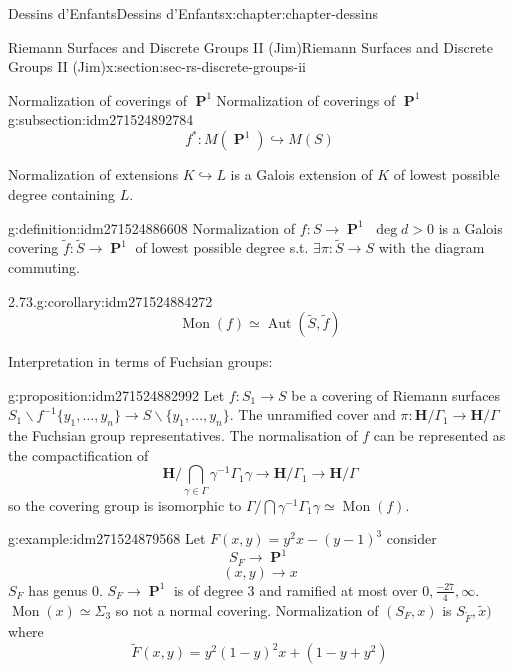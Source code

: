 \documentclass[oneside,10pt,]{book}
\numberwithin{equation}{section}
\newcommand{\inv}{^{-1}}
\newcommand{\HH}{\mathbf{H}}
\DeclareMathOperator{\PP}{\mathbf{P}}
\DeclareMathOperator{\Aut}{Aut}
\newcommand{\gt}{>}
\begin{document}
\begin{chapterptx}{Dessins d'Enfants}{}{Dessins d'Enfants}{}{}{x:chapter:chapter-dessins}
\begin{sectionptx}{Riemann Surfaces and Discrete Groups II (Jim)}{}{Riemann Surfaces and Discrete Groups II (Jim)}{}{}{x:section:sec-rs-discrete-groups-ii}
\begin{subsectionptx}{Normalization of coverings of \(\PP^1\)}{}{Normalization of coverings of \(\PP^1\)}{}{}{g:subsection:idm271524892784}
\begin{equation*}
f^* \colon M(\PP^1 ) \hookrightarrow M(S)
\end{equation*}
%
\par
Normalization of extensions \(K \hookrightarrow L\) is a Galois extension of \(K \) of lowest possible degree containing \(L\).%
\begin{definition}{}{g:definition:idm271524886608}%
Normalization of \(f\colon S\to \PP^1\) \(\deg d \gt 0 \) is a Galois covering \(\tilde f \colon \tilde S \to \PP^1 \) of  lowest possible degree s.t. \(\exists \pi \colon \tilde S \to S\) with  the diagram commuting.%
\end{definition}
\begin{corollary}{2.73.}{}{g:corollary:idm271524884272}%
%
\begin{equation*}
\operatorname{Mon}(f)  \simeq \Aut(\tilde S, \tilde f)
\end{equation*}
%
\end{corollary}
Interpretation in terms of Fuchsian groups:%
\begin{proposition}{}{}{g:proposition:idm271524882992}%
Let \(f\colon S_1 \to S\) be a covering of Riemann surfaces \(S_1\smallsetminus f\inv \{ y_1, \ldots, y_n \} \to S \smallsetminus\{ y_1, \ldots, y_n \}\). The unramified cover and \(\pi \colon \HH/ \Gamma_1 \to \HH/ \Gamma\) the Fuchsian group representatives. The normalisation of \(f\) can be represented as the compactification of%
\begin{equation*}
\HH/ \bigcap_{\gamma \in \Gamma} \gamma \inv \Gamma_1 \gamma \to \HH/\Gamma_1 \to \HH/\Gamma
\end{equation*}
so the covering group is isomorphic to \(\Gamma/ \bigcap \gamma \inv \Gamma_1 \gamma \simeq \operatorname{Mon}(f)\).%
\end{proposition}
\begin{example}{}{g:example:idm271524879568}%
Let \(F(x,y) = y^2x - (y-1)^3\) consider%
\begin{equation*}
S_F \to \PP^1
\end{equation*}
%
\begin{equation*}
(x,y) \to x
\end{equation*}
\(S_F\) has genus 0. \(S_F \to \PP^1\) is of degree 3 and ramified at most over \(0, \frac{-27}{4}, \infty\). \(\operatorname{Mon}(x)  \simeq \Sigma_3\) so not a normal covering. Normalization of \((S_F, x)\) is \(S_{\tilde F} , \tilde x)\) where%
\begin{equation*}
\tilde F (x,y) = y^2 ( 1-y)^2 x +  (1-y + y^2)

\end{equation*}
\end{example}
\end{subsectionptx}
\end{sectionptx}
\end{chapterptx}
\end{document}
